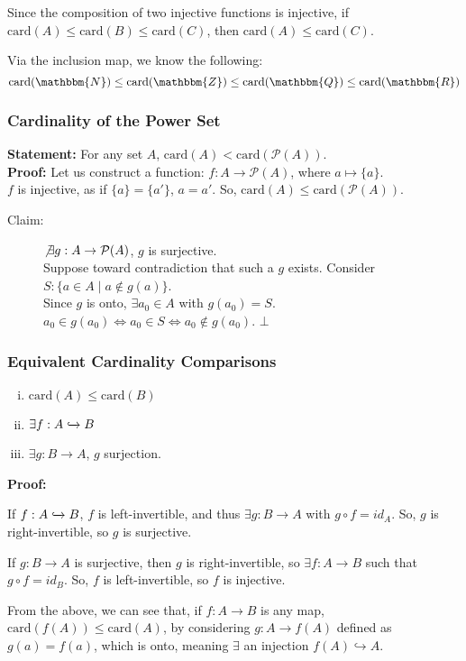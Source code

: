 \documentclass[10pt]{extarticle}
\begin{document}
    Since the composition of two injective functions is injective, if $\text{card}(A) \leq \text{card}(B) \leq \text{card}(C)$, then $\text{card}(A) \leq \text{card}(C)$.

      Via the inclusion map, we know the following:
      \[
        \text{card}(\mathbbm{N}) \leq \text{card}(\mathbbm{Z}) \leq \text{card}(\mathbbm{Q}) \leq \text{card}(\mathbbm{R})
      \] 
      \subsubsection{Cardinality of the Power Set}%
      \textbf{Statement:} For any set $A$, $\text{card}(A) < \text{card}(\mathcal{P}(A))$.\\

      \textbf{Proof:} Let us construct a function: $f: A \rightarrow \mathcal{P}(A)$, where $a \mapsto \{a\}$.\\

      $f$ is injective, as if $\{a\} = \{a'\}$, $a = a'$. So, $\text{card}(A) \leq \text{card}(\mathcal{P}(A))$.
      \begin{description}
        \item[Claim:] $\not\exists g: A\rightarrow \mathcal{P}(A)$, $g$ is surjective.\\

      Suppose toward contradiction that such a $g$ exists. Consider $S: \{a\in A \mid a\notin g(a)\}$.\\

      Since $g$ is onto, $\exists a_0\in A$ with $g(a_0) = S$. $a_0 \in g(a_0) \Leftrightarrow a_0\in S \Leftrightarrow a_0\notin g(a_0)$. $\bot$\\
      \end{description}
      \subsubsection{Equivalent Cardinality Comparisons}%
      \begin{enumerate}[(i)]
        \item $\text{card}(A) \leq \text{card}(B)$
        \item $\exists f: A\xhookrightarrow{} B$
        \item $\exists g: B\rightarrow A$, $g$ surjection.
      \end{enumerate}
      \textbf{Proof:}
      \begin{description}[font=\normalfont]
        \item[(ii) $\Rightarrow$ (iii)] If $f: A\xhookrightarrow{} B$, $f$ is left-invertible, and thus $\exists g: B\rightarrow A$ with $g\circ f = id_A$. So, $g$ is right-invertible, so $g$ is surjective.
        \item[(iii) $\Rightarrow$ (ii)] If $g: B \rightarrow A$ is surjective, then $g$ is right-invertible, so $\exists f: A\rightarrow B$ such that $g\circ f = id_B$. So, $f$ is left-invertible, so $f$ is injective.
      \end{description}
      From the above, we can see that, if $f: A\rightarrow B$ is any map, $\text{card}(f(A)) \leq \text{card}(A)$, by considering $g: A\rightarrow f(A)$ defined as $g(a) = f(a)$, which is onto, meaning $\exists$ an injection $f(A) \hookrightarrow A$.
\end{document}
